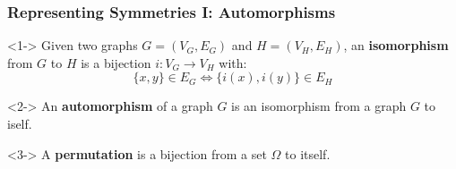 \documentclass{beamer}
\begin{document}
\begin{frame}
  \frametitle{Representing Symmetries I: Automorphisms}

  \begin{definition}<1->
    Given two graphs $G = (V_G, E_G)$ and $H = (V_H, E_H)$, an
    \textbf{isomorphism} from $G$ to $H$ is a bijection $i: V_G \rightarrow V_H$
    with:
    $$
      \{x,y\} \in E_G \Leftrightarrow \{i(x),i(y)\} \in E_H
    $$
  \end{definition}

  \begin{definition}<2->
    An \textbf{automorphism} of a graph $G$ is an isomorphism from a graph $G$
    to iself.
  \end{definition}

  \begin{definition}<3->
    A \textbf{permutation} is a bijection from a set $\Omega$ to itself.
  \end{definition}
\end{frame}
\end{document}
